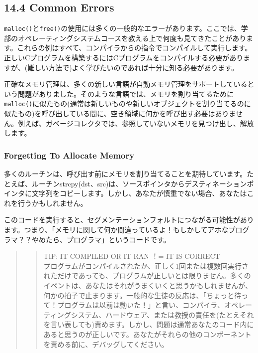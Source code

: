 \hypertarget{common-errors}{%
\subsection*{14.4 Common Errors}\label{common-errors}}

\texttt{malloc()}と\texttt{free()}の使用には多くの一般的なエラーがあります。ここでは、学部のオペレーティングシステムコースを教える上で何度も見てきたことがあります。これらの例はすべて、コンパイラからの指令でコンパイルして実行します。正しいCプログラムを構築するにはCプログラムをコンパイルする必要がありますが、(難しい方法で)よく学びたいのであれば十分に知る必要があります。

正確なメモリ管理は、多くの新しい言語が自動メモリ管理をサポートしているという問題がありました。そのような言語では、メモリを割り当てるために\texttt{malloc()}に似たもの(通常は新しいものや新しいオブジェクトを割り当てるのに似たもの)を呼び出している間に、空き領域に何かを呼び出す必要はありません。例えば、ガベージコレクタでは、参照していないメモリを見つけ出し、解放します。

\hypertarget{forgetting-to-allocate-memory}{%
\subsubsection*{Forgetting To Allocate
Memory}\label{forgetting-to-allocate-memory}}

多くのルーチンは、呼び出す前にメモリを割り当てることを期待しています。たとえば、ルーチンstrcpy(dst、src)は、ソースポインタからデスティネーションポインタに文字列をコピーします。しかし、あなたが慎重でない場合、あなたはこれを行うかもしれません。

\begin{Shaded}
\begin{Highlighting}[]
\NormalTok{;}
\end{Highlighting}
\end{Shaded}

このコードを実行すると、セグメンテーションフォルトにつながる可能性があります。つまり、「メモリに関して何か間違っているよ！もしかしてアホなプログラマ？？やめたら、プログラマ」というコードです。

\begin{quote}
\begin{quote}
TIP: IT COMPILED OR IT RAN ！= IT IS CORRECT\\
プログラムがコンパイルされたか、正しく1回または複数回実行されただけであっても、プログラムが正しいとは限りません。多くのイベントは、あなたはそれがうまくいくと思うかもしれませんが、何かの拍子で止まります。一般的な生徒の反応は、「ちょっと待って！プログラムは以前は動いた！」と言い、コンパイラ、オペレーティングシステム、ハードウェア、または教授の責任を(たとえそれを言い表しても)責めます。しかし、問題は通常あなたのコード内にあると思うのが正しいです。あなたがそれらの他のコンポーネントを責める前に、デバッグしてください。
\end{quote}
\end{quote}

